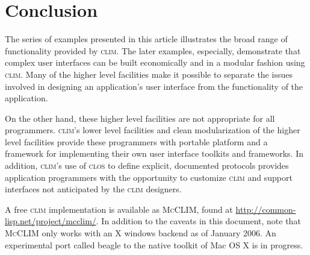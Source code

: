 \documentclass[twocolumn,a4paper]{article}
\newcommand {\code}[1]{{\sffamily #1}}
\newcommand {\CLIM}{\textsc{clim}}
\newcommand {\CLOS}{\textsc{clos}}
\newcommand {\mcclim}{\textsc{McCLIM}}
\let\method\code
\let\constant\code
\begin{document}
% 

\section{Conclusion}

The series of examples presented in this article illustrates the broad
range of functionality provided by \CLIM{}. The later examples,
especially, demonstrate that complex user interfaces can be built
economically and in a modular fashion using \CLIM{}. Many of the higher level
facilities make it possible to separate the issues involved in
designing an application's user interface from the functionality of
the application.

On the other hand, these higher level facilities are not
appropriate for all programmers. \CLIM{}'s lower level facilities and clean
modularization of the higher level facilities provide these programmers with
portable platform and a framework for implementing their own user
interface toolkits and frameworks. In addition, \CLIM{}'s use of \CLOS{}
to define explicit, documented protocols provides application
programmers with the opportunity to customize \CLIM{} and support
interfaces not anticipated by the \CLIM{} designers.

A free \CLIM{} implementation is available as \mcclim{}, found at
\url{http://common-lisp.net/project/mcclim/}. In addition to the
caveats in this document, note that \mcclim{} only works with an X
windows backend as of January 2006.  An experimental port called
beagle to the native toolkit of Mac OS X is in progress.
\end{document}

